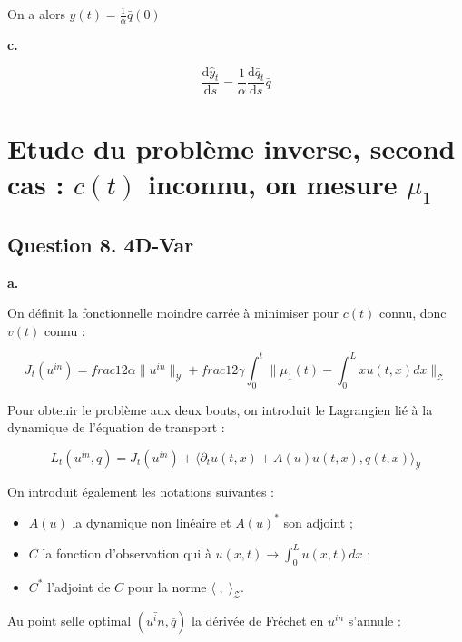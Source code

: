\documentclass[a4paper]{article}
\newcommand{\Y}{\mathscr{Y}}
\newcommand{\Z}{\mathscr{Z}}
\begin{document}
On a alors $\hat{y}(t) = \displaystyle \frac{1}{\alpha} \bar{q}(0)$

\textbf{c.}

\[
\displaystyle \frac{\mathrm{d} \hat{y}_t }{\mathrm{d}s} = \frac{1}{\alpha} \frac{\mathrm{d}\bar{q}_t}{\mathrm{d}s} \bar{q} 
\]

\section{Etude du problème inverse, second cas : $c(t)$ inconnu, on mesure $\mu_1$}

				
\subsection*{Question 8. 4D-Var}


\textbf{a.}

On définit la fonctionnelle moindre carrée à minimiser pour $c(t)$ connu, donc $v(t)$ connu :

\[ J_t(u^{in}) = \displaystyle frac{1}{2}      
              \alpha \| u^{in} \|_{\Y} +  
			  \displaystyle frac{1}{2}      
			  \gamma \int_0^t \| \mu_1(t) - \int_0^L x u(t,x)dx \|_{\Z} \]

Pour obtenir le problème aux deux bouts, on introduit le Lagrangien lié à la dynamique de l'équation de transport :

\[ L_t(u^{in},q) = J_t(u^{in}) + \langle \partial_t u(t,x) + A(u) u(t,x), q(t,x) \rangle_{\Y} \]

On introduit également les notations suivantes :
\begin{itemize}
    \item $A(u)$ la dynamique non linéaire et $A(u)^*$ son adjoint ;
	\item $C$ la fonction d'observation qui à $u(x,t) \to \int_0^L u(x,t)dx$ ;
	\item $C^*$ l'adjoint de $C$ pour la norme $\langle \;, \; \rangle_{\Z}$.
\end{itemize}
Au point selle optimal $(\bar{u^in}, \bar{q})$ la dérivée de Fréchet en $u^{in}$ s'annule :
\end{document}
